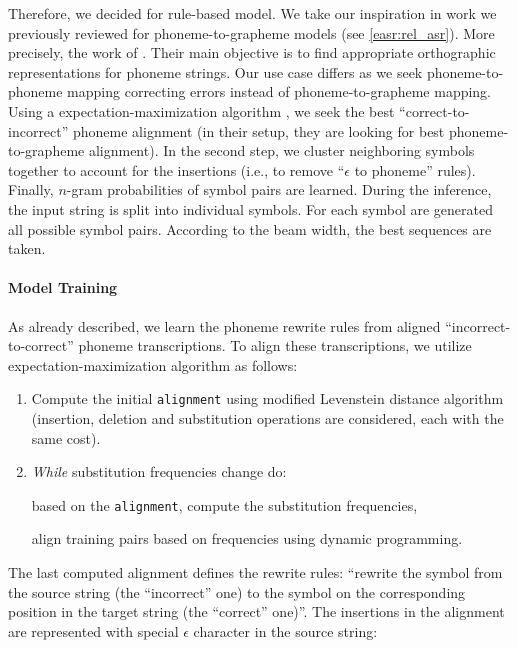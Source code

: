 Therefore, we decided for rule-based model. We take our inspiration in work we previously reviewed for phoneme-to-grapheme models (see \cref{easr:rel_asr}). More precisely, the work of . Their main objective is to find appropriate orthographic representations for phoneme strings. Our use case differs as we seek phoneme-to-phoneme mapping correcting errors instead of phoneme-to-grapheme mapping. Using a expectation-maximization algorithm , we seek the best ``correct-to-incorrect'' phoneme alignment (in their setup, they are looking for best phoneme-to-grapheme alignment). In the second step, we cluster neighboring symbols together to account for the insertions (i.e., to remove ``$\epsilon$ to phoneme'' rules). Finally, $n$-gram probabilities of symbol pairs are learned. During the inference, the input string is split into individual symbols. For each symbol are generated all possible symbol pairs. According to the beam width, the best sequences are taken. 

\paragraph{Model Training}
As already described, we learn the phoneme rewrite rules from aligned ``incorrect-to-correct'' phoneme transcriptions. To align these transcriptions, we utilize expectation-maximization algorithm as follows:

\begin{enumerate}
	\item Compute the initial \texttt{alignment} using modified Levenstein distance algorithm (insertion, deletion and substitution operations are considered, each with the same cost).
	
	\item \emph{While} substitution frequencies change do:
	\begin{enumerate}
		 based on the \texttt{alignment}, compute the substitution frequencies,
		
		 align training pairs  based on frequencies using dynamic programming.
	\end{enumerate}
\end{enumerate}

The last computed alignment defines the rewrite rules: ``rewrite the symbol from the source string (the ``incorrect'' one) to the symbol on the corresponding position in the target string (the ``correct'' one)''. The insertions in the alignment are represented with special $\epsilon$ character in the source string:

